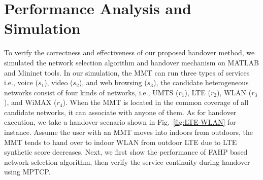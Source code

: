 \documentclass[conference]{IEEEtran}
\begin{document}




\section{Performance Analysis and Simulation }


To verify the correctness and effectiveness of our proposed handover method, 
we simulated the network selection algorithm and handover mechanism on MATLAB and Mininet tools.
In our simulation, the MMT can run three types of services i.e.,  voice ($s_1$), video ($s_2$), and web browsing ($s_3$),
the candidate heterogeneous networks consist of four kinds of networks, i.e., UMTS ($r_1$), LTE ($r_2$), WLAN ($r_3$), and WiMAX ($r_4$). When the MMT is located in the common coverage of all candidate networks, it can associate with anyone of them.
As for handover execution, we take a handover scenario shown in Fig.~\ref{fig:LTE-WLAN} for instance. Assume the user with an MMT moves into indoors from outdoors, the MMT tends to hand over to indoor WLAN from outdoor LTE due to LTE synthetic score decreases.
Next, we first show the performance of FAHP based network selection algorithm, then verify the service continuity during handover using MPTCP.

\end{document}
